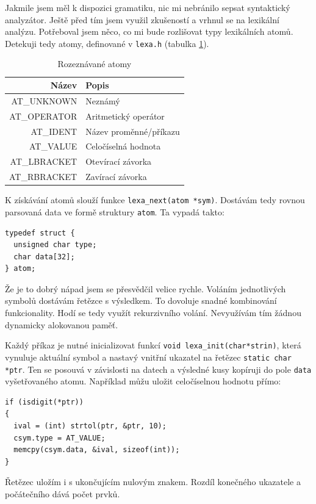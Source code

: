 \documentclass[a4paper, 12pt]{article}
\begin{document}
Jakmile jsem měl k dispozici gramatiku, nic mi nebránilo sepsat
syntaktický analyzátor. Ještě před tím jsem využil zkušeností a vrhnul
se na lexikální analýzu.  Potřeboval jsem něco, co mi bude rozlišovat
typy lexikálních atomů. Detekuji tedy atomy, definované v
\texttt{lexa.h} (tabulka \ref{tab:atom}).

\begin{table}
\centering
\begin{tabular}{|r|l|}
\hline
Název & Popis\\ \hline\hline
AT\_UNKNOWN & Neznámý\\ \hline
AT\_OPERATOR & Aritmetický operátor\\ \hline
AT\_IDENT & Název proměnné/příkazu\\ \hline
AT\_VALUE & Celočíselná hodnota\\ \hline
AT\_LBRACKET & Otevírací závorka\\ \hline
AT\_RBRACKET & Zavírací závorka\\
\hline
\end{tabular}
\caption{Rozeznávané atomy}
\label{tab:atom}
\end{table}

K získávání atomů slouží funkce \verb+lexa_next(atom *sym)+.  Dostávám
tedy rovnou parsovaná data ve formě struktury \texttt{atom}.  Ta
vypadá takto:
\begin{lstlisting}
typedef struct {
  unsigned char type;
  char data[32];
} atom;
\end{lstlisting}

Že je to dobrý nápad jsem se přesvědčil velice rychle. Voláním
jednotlivých symbolů dostávám řetězce s výsledkem. To dovoluje snadné
kombinování funkcionality. Hodí se tedy využít rekurzivního
volání. Nevyužívám tím žádnou dynamicky alokovanou paměť.

Každý příkaz je nutné inicializovat funkcí
\verb+void lexa_init(char*strin)+, která vynuluje aktuální symbol a
nastavý vnitřní ukazatel na řetězec \texttt{static char *ptr}. Ten se
posouvá v závislosti na datech a výsledné kusy kopíruji do pole
\texttt{data} vyšetřovaného atomu. Například můžu uložit celočíselnou
hodnotu přímo:

\begin{lstlisting}
if (isdigit(*ptr))
{
  ival = (int) strtol(ptr, &ptr, 10);
  csym.type = AT_VALUE;
  memcpy(csym.data, &ival, sizeof(int));
}
\end{lstlisting}

Řetězec uložím i s ukončujícím nulovým znakem.  Rozdíl konečného
ukazatele a počátečního dává počet prvků.
\end{document}

